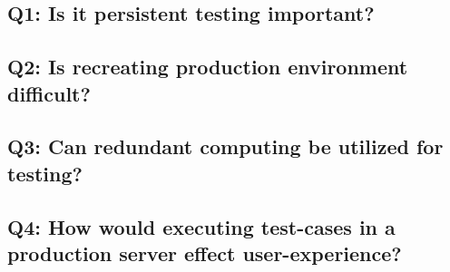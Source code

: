 \subsection{\textbf{Q1:} Is it persistent testing important?}
\subsection{\textbf{Q2:} Is recreating production environment difficult?}
\subsection{\textbf{Q3:} Can redundant computing be utilized for testing?}
\subsection{\textbf{Q4:} How would executing test-cases in a production server effect user-experience?}
